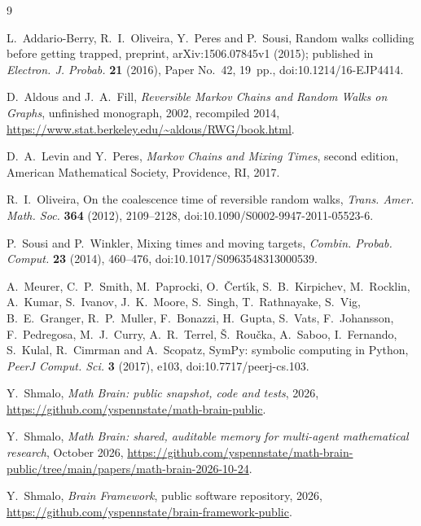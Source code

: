 \documentclass[11pt,a4paper]{article}
\numberwithin{equation}{section}
\theoremstyle{remark}
\begin{document}
\begin{thebibliography}{9}

 L.~Addario-Berry, R.~I.~Oliveira, Y.~Peres and P.~Sousi, Random walks colliding before getting trapped, preprint, arXiv:1506.07845v1 (2015); published in \emph{Electron. J. Probab.} \textbf{21} (2016), Paper No.~42, 19~pp., doi:10.1214/16-EJP4414.

 D.~Aldous and J.~A.~Fill, \emph{Reversible Markov Chains and Random Walks on Graphs}, unfinished monograph, 2002, recompiled 2014, \url{https://www.stat.berkeley.edu/~aldous/RWG/book.html}.

 D.~A.~Levin and Y.~Peres, \emph{Markov Chains and Mixing Times}, second edition, American Mathematical Society, Providence, RI, 2017.

 R.~I.~Oliveira, On the coalescence time of reversible random walks, \emph{Trans. Amer. Math. Soc.} \textbf{364} (2012), 2109--2128, doi:10.1090/S0002-9947-2011-05523-6.

 P.~Sousi and P.~Winkler, Mixing times and moving targets, \emph{Combin. Probab. Comput.} \textbf{23} (2014), 460--476, doi:10.1017/S0963548313000539.

 A.~Meurer, C.~P.~Smith, M.~Paprocki, O.~\v{C}ert\'{\i}k, S.~B.~Kirpichev, M.~Rocklin, A.~Kumar, S.~Ivanov, J.~K.~Moore, S.~Singh, T.~Rathnayake, S.~Vig, B.~E.~Granger, R.~P.~Muller, F.~Bonazzi, H.~Gupta, S.~Vats, F.~Johansson, F.~Pedregosa, M.~J.~Curry, A.~R.~Terrel, \v{S}.~Rou\v{c}ka, A.~Saboo, I.~Fernando, S.~Kulal, R.~Cimrman and A.~Scopatz, SymPy: symbolic computing in Python, \emph{PeerJ Comput. Sci.} \textbf{3} (2017), e103, doi:10.7717/peerj-cs.103.

 Y.~Shmalo, \emph{Math Brain: public snapshot, code and tests}, 2026, \url{https://github.com/yspennstate/math-brain-public}.

 Y.~Shmalo, \emph{Math Brain: shared, auditable memory for multi-agent mathematical research}, October 2026, \url{https://github.com/yspennstate/math-brain-public/tree/main/papers/math-brain-2026-10-24}.

 Y.~Shmalo, \emph{Brain Framework}, public software repository, 2026, \url{https://github.com/yspennstate/brain-framework-public}.

\end{thebibliography}
\end{document}
